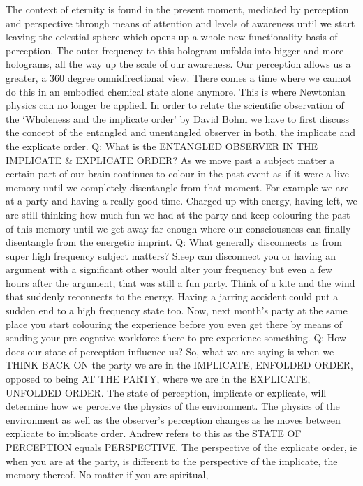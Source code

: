 The context of eternity is found in the present moment, mediated by
perception and perspective through means of attention and levels of
awareness until we start leaving the celestial sphere which opens up a
whole new functionality basis of perception. The outer frequency to this
hologram unfolds into bigger and more holograms, all the way up the
scale of our awareness. Our perception allows us a greater, a 360 degree
omnidirectional view. There comes a time where we cannot do this in an
embodied chemical state alone anymore. This is where Newtonian physics
can no longer be applied. In order to relate the scientific observation
of the `Wholeness and the implicate order' by David Bohm we have to
first discuss the concept of the entangled and unentangled observer in
both, the implicate and the explicate order. Q: What is the ENTANGLED
OBSERVER IN THE IMPLICATE \& EXPLICATE ORDER? As we move past a subject
matter a certain part of our brain continues to colour in the past event
as if it were a live memory until we completely disentangle from that
moment. For example we are at a party and having a really good time.
Charged up with energy, having left, we are still thinking how much fun
we had at the party and keep colouring the past of this memory until we
get away far enough where our consciousness can finally disentangle from
the energetic imprint. Q: What generally disconnects us from super high
frequency subject matters? Sleep can disconnect you or having an
argument with a significant other would alter your frequency but even a
few hours after the argument, that was still a fun party. Think of a
kite and the wind that suddenly reconnects to the energy. Having a
jarring accident could put a sudden end to a high frequency state too.
Now, next month's party at the same place you start colouring the
experience before you even get there by means of sending your
pre-cogntive workforce there to pre-experience something. Q: How does
our state of perception influence us? So, what we are saying is when we
THINK BACK ON the party we are in the IMPLICATE, ENFOLDED ORDER, opposed
to being AT THE PARTY, where we are in the EXPLICATE, UNFOLDED ORDER.
The state of perception, implicate or explicate, will determine how we
perceive the physics of the environment. The physics of the environment
as well as the observer's perception changes as he moves between
explicate to implicate order. Andrew refers to this as the STATE OF
PERCEPTION equals PERSPECTIVE. The perspective of the explicate order,
ie when you are at the party, is different to the perspective of the
implicate, the memory thereof. No matter if you are spiritual,

